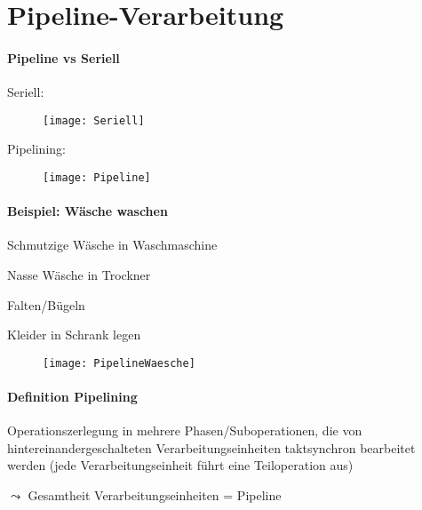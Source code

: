 \section{Pipeline-Verarbeitung}
\label{sec:pipelining}

\paragraph{Pipeline vs Seriell}
\begin{items}
  \item Seriell:
  \begin{figure}[H]
    \centering
    \texttt{[image: Seriell]}
    \label{Seriell}
  \end{figure}
  \item Pipelining:
  \begin{figure}[H]
    \centering
    \texttt{[image: Pipeline]}
    \label{Pipeline}
  \end{figure}
\end{items}

\paragraph{Beispiel: Wäsche waschen}
\begin{enumeration}
  \item Schmutzige Wäsche in Waschmaschine
  \item Nasse Wäsche in Trockner
  \item Falten/Bügeln
  \item Kleider in Schrank legen
\end{enumeration}
\begin{figure}[H]
  \centering
  \label{PipelineWaesche}
  \texttt{[image: PipelineWaesche]}
\end{figure}

\paragraph{Definition Pipelining}
\begin{items}
  \item Operationszerlegung in mehrere Phasen/Suboperationen, die von hintereinandergeschalteten Verarbeitungseinheiten taktsynchron bearbeitet werden (jede Verarbeitungseinheit führt eine Teiloperation aus)
  \item \( \leadsto \) Gesamtheit Verarbeitungseinheiten = Pipeline
\end{items}


